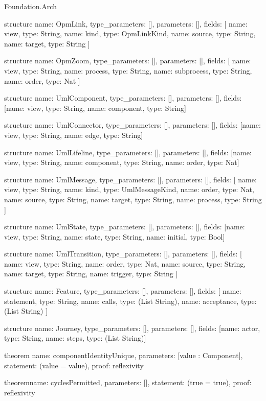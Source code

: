 \begin{lexlean}{Foundation.Arch}
\begin{semanticmodule}
structure{
  name: OpmLink,
  type_parameters: [],
  parameters: [],
  fields: [
    {name: view, type: String},
    {name: kind, type: OpmLinkKind},
    {name: source, type: String},
    {name: target, type: String}
  ]
}

structure{
  name: OpmZoom,
  type_parameters: [],
  parameters: [],
  fields: [
    {name: view, type: String},
    {name: process, type: String},
    {name: subprocess, type: String},
    {name: order, type: Nat}
  ]
}

structure{
  name: UmlComponent,
  type_parameters: [],
  parameters: [],
  fields: [{name: view, type: String}, {name: component, type: String}]
}

structure{
  name: UmlConnector,
  type_parameters: [],
  parameters: [],
  fields: [{name: view, type: String}, {name: edge, type: String}]
}

structure{
  name: UmlLifeline,
  type_parameters: [],
  parameters: [],
  fields: [{name: view, type: String}, {name: component, type: String}, {name: order, type: Nat}]
}

structure{
  name: UmlMessage,
  type_parameters: [],
  parameters: [],
  fields: [
    {name: view, type: String},
    {name: kind, type: UmlMessageKind},
    {name: order, type: Nat},
    {name: source, type: String},
    {name: target, type: String},
    {name: process, type: String}
  ]
}

structure{
  name: UmlState,
  type_parameters: [],
  parameters: [],
  fields: [{name: view, type: String}, {name: state, type: String}, {name: initial, type: Bool}]
}

structure{
  name: UmlTransition,
  type_parameters: [],
  parameters: [],
  fields: [
    {name: view, type: String},
    {name: order, type: Nat},
    {name: source, type: String},
    {name: target, type: String},
    {name: trigger, type: String}
  ]
}

structure{
  name: Feature,
  type_parameters: [],
  parameters: [],
  fields: [
    {name: statement, type: String},
    {name: calls, type: (List String)},
    {name: acceptance, type: (List String)}
  ]
}

structure{
  name: Journey,
  type_parameters: [],
  parameters: [],
  fields: [{name: actor, type: String}, {name: steps, type: (List String)}]
}

theorem{
  name: componentIdentityUnique,
  parameters: [value : Component],
  statement: (value = value),
  proof: reflexivity{}
}

theorem{name: cyclesPermitted, parameters: [], statement: (true = true), proof: reflexivity{}}
\end{semanticmodule}
\end{lexlean}

